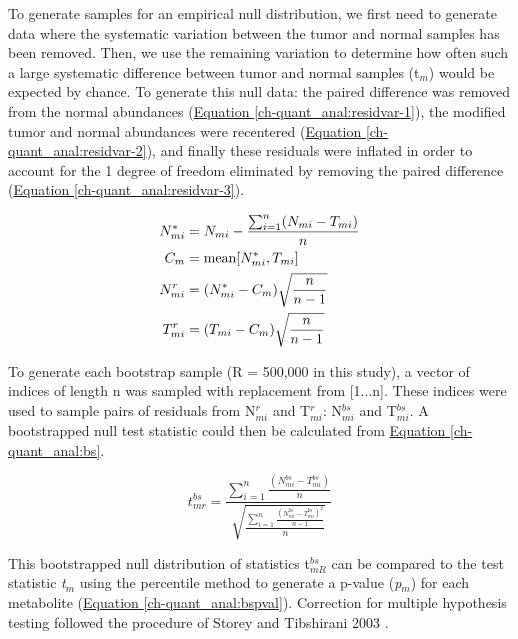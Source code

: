 To generate samples for an empirical null distribution, we first need to generate data where the systematic variation between the tumor and normal samples has been removed. Then, we use the remaining variation to determine how often such a large systematic difference between tumor and normal samples (t$_{m}$) would be expected by chance.  To generate this null data: the paired difference was removed from the normal abundances (\hyperref[ch-quant_anal:residvar-1]{Equation \ref{ch-quant_anal:residvar-1}}), the modified tumor and normal abundances were recentered (\hyperref[ch-quant_anal:residvar-2]{Equation \ref{ch-quant_anal:residvar-2}}), and finally these residuals were inflated in order to account for the 1 degree of freedom eliminated by removing the paired difference (\hyperref[ch-quant_anal:residvar-3]{Equation \ref{ch-quant_anal:residvar-3}}).

\begin{subequations}
\begin{align}
N^{*}_{mi} &= N_{mi} - \frac{\sum_{i = 1}^{n}(N_{mi} - T_{mi})}{n}\label{ch-quant_anal:residvar-1}\\
C_{m} &= \text{mean}[N^{*}_{mi}, T_{mi}]\label{ch-quant_anal:residvar-2}\\
N^{r}_{mi} &= (N^{*}_{mi} - C_{m})\sqrt{\frac{n}{n - 1}}\notag\\
T^{r}_{mi} &= (T_{mi} - C_{m})\sqrt{\frac{n}{n - 1}}\label{ch-quant_anal:residvar-3}
\end{align}
\end{subequations}


To generate each bootstrap sample (R = 500,000 in this study), a vector of indices of length n was sampled with replacement from [1...n]. These indices were used to sample pairs of residuals from N$^{r}_{mi}$ and T$^{r}_{mi}$: N$^{bs}_{mi}$ and T$^{bs}_{mi}$.  A bootstrapped null test statistic could then be calculated from \hyperref[ch-quant_anal:bs]{Equation \ref{ch-quant_anal:bs}}.

\begin{equation}
t^{bs}_{mr} = \frac{\sum_{i = 1}^{n}\frac{(N^{bs}_{mi} - T^{bs}_{mi})}{n}}{\sqrt{\frac{\sum_{i = 1}^{n}\frac{(N^{bs}_{mi} - T^{bs}_{mi})^{2}}{n-1}}{n}}}\label{ch-quant_anal:bs}
\end{equation}

This bootstrapped null distribution of statistics t$^{bs}_{mR}$ can be compared to the test statistic \textit{t}$_{m}$ using the percentile method to generate a p-value (\textit{p}$_{m}$) for each metabolite (\hyperref[ch-quant_anal:bspval]{Equation \ref{ch-quant_anal:bspval}}). Correction for multiple hypothesis testing followed the procedure of Storey and Tibshirani 2003 \cite{Storey:2003cj}.

